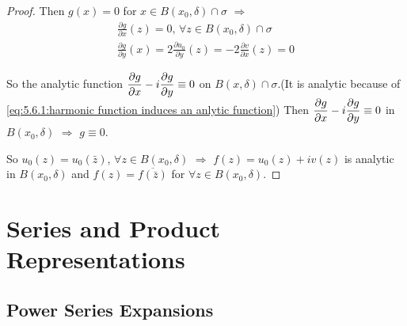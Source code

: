 \begin{proof}
    Then  $ g(x)=0 $ for  $ x\in B(x_0,\delta)\cap \sigma $ $ \Rightarrow  $ 
    \begin{align*}
        \frac{\partial g}{\partial x}(z)=0,\,\forall z\in B(x_0,\delta)\cap\sigma\\
        \frac{\partial g}{\partial y}(x)=2\frac{\partial u_0}{\partial y}(z)=-2\frac{\partial v}{\partial x}(z)=0
    \end{align*}  

    So the analytic function  $ \displaystyle\frac{\partial g}{\partial x}-i\frac{\partial g}{\partial y}\equiv 0 $ on   $ B(x,\delta)\cap \sigma $.(It is analytic because of \eqref{eq:5.6.1:harmonic function induces an anlytic function}) Then  $ \displaystyle\frac{\partial g}{\partial x}-i\frac{\partial g}{\partial y}\equiv 0 $  in  $ B(x_0,\delta) $ $ \Rightarrow  $   $ g\equiv 0 $.
    
    So  $ u_0(z)=u_0(\bar{z}) $,  $ \forall z\in B(x_0,\delta) $  $ \Rightarrow  $  $ f(z)=u_0(z)+i v(z) $ is analytic in  $ B(x_0,\delta) $ and  $ f(z)=\overline{f(\bar{z})} $ for  $ \forall z\in B(x_0,\delta) $.



\end{proof}

\section{Series and Product Representations}
\subsection{Power Series Expansions}
